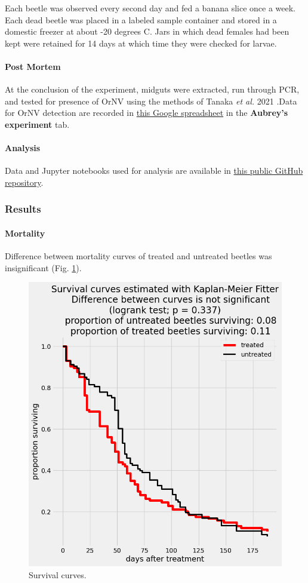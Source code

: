 \documentclass[12pt,letterpaper,english,bibliography=totocnumbered, abstract=on]{scrartcl}
\begin{document}
Each beetle was observed every second day and fed a banana slice once a week. Each dead beetle was placed in a labeled sample container and stored in a domestic freezer at about -20 degrees C. Jars in which dead females had been kept were retained for 14 days at which time they were checked for larvae.

\paragraph{Post Mortem}

At the conclusion of the experiment, midguts were extracted, run through PCR, and tested for presence of OrNV using the methods of Tanaka \textit{et al.} 2021 \cite{tanakaConfirmationOryctesRhinoceros2021a}.Data for OrNV detection are recorded in \href{https://docs.google.com/spreadsheets/d/16k_lN9cihTnvhMoP54xnTwzWUBTzk1yDP79HW02dy5M/edit#gid=784130063}{this Google spreadsheet} in the \textbf{Aubrey's experiment} tab.

\paragraph{Analysis}

Data and Jupyter notebooks used for analysis are available in \href{https://github.com/aubreymoore/palau-guts-experiment}{this public GitHub repository}. 

\subsubsection{Results}

\paragraph{Mortality} Difference between mortality curves of treated and untreated beetles was insignificant (Fig. \ref{fig:palau-bioassay-1-survival-curves}).
\begin{figure}[h]
	\centering
	\includegraphics[width=0.7\linewidth]{"images/Palau bioassay 1 survival curves"}
	\caption{Survival curves.}
	\label{fig:palau-bioassay-1-survival-curves}
\end{figure}
\end{document}
